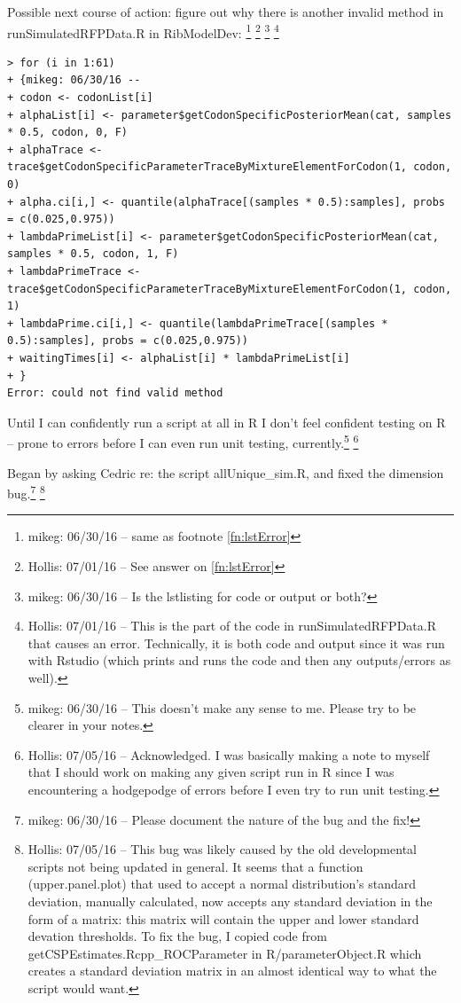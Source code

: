 \documentclass[12pt,hyperref]{labbook}
\newcommand{\sep}{\discretionary{}{}{}} %
\begin{document}
Possible next course of action: figure out why there is another invalid method
in run\sep Simulated\sep RFP\sep Data\sep .\sep R in Rib\sep Model\sep Dev:
\footnote{mikeg: 06/30/16 -- same as footnote \ref{fn:lstError}}
\footnote{Hollis: 07/01/16 -- See answer on \ref{fn:lstError}}
\footnote{mikeg: 06/30/16 -- Is the lstlisting for code or output or both?}
\footnote{Hollis: 07/01/16 -- This is the part of the code in runSimulatedRFPData.R that causes an error.
Technically, it is both code and output since it was run with Rstudio (which prints and runs the code and then any outputs/errors as well).}

\noindent\begin{minipage}{\linewidth}
\begin{lstlisting}
> for (i in 1:61)
+ {mikeg: 06/30/16 --
+ codon <- codonList[i]
+ alphaList[i] <- parameter$getCodonSpecificPosteriorMean(cat, samples * 0.5, codon, 0, F)
+ alphaTrace <- trace$getCodonSpecificParameterTraceByMixtureElementForCodon(1, codon, 0)
+ alpha.ci[i,] <- quantile(alphaTrace[(samples * 0.5):samples], probs = c(0.025,0.975))
+ lambdaPrimeList[i] <- parameter$getCodonSpecificPosteriorMean(cat, samples * 0.5, codon, 1, F)
+ lambdaPrimeTrace <- trace$getCodonSpecificParameterTraceByMixtureElementForCodon(1, codon, 1)
+ lambdaPrime.ci[i,] <- quantile(lambdaPrimeTrace[(samples * 0.5):samples], probs = c(0.025,0.975))
+ waitingTimes[i] <- alphaList[i] * lambdaPrimeList[i]
+ }
Error: could not find valid method
\end{lstlisting}
\end{minipage}

Until I can confidently run a script at all in R I don't feel confident testing on R --
prone to errors before I can even run unit testing, currently.\footnote{mikeg: 06/30/16 -- This doesn't make any sense to me.  Please try to be clearer in your notes. }
\footnote{Hollis: 07/05/16 -- Acknowledged. 
I was basically making a note to myself that I should work on making any given script run in R since I was encountering a hodgepodge of errors before I even try to run unit testing.}


Began by asking Cedric re: the script all\sep Unique\sep \_\sep sim.R, and fixed the dimension bug.\footnote{mikeg: 06/30/16 -- Please document the nature of the bug and the fix!}
\footnote{Hollis: 07/05/16 -- This bug was likely caused by the old developmental scripts not being updated in general.
It seems that a function (upper.panel.plot) that used to accept a normal distribution's standard deviation, manually calculated, now accepts any standard deviation in the form of a matrix: this matrix will contain the upper and lower standard devation thresholds.
To fix the bug, I copied code from getCSPEstimates.Rcpp\_ROCParameter in R/parameterObject.R which creates a standard deviation matrix in an almost identical way to what the script would want.\label{fn:dimensionFix}}
\end{document}

